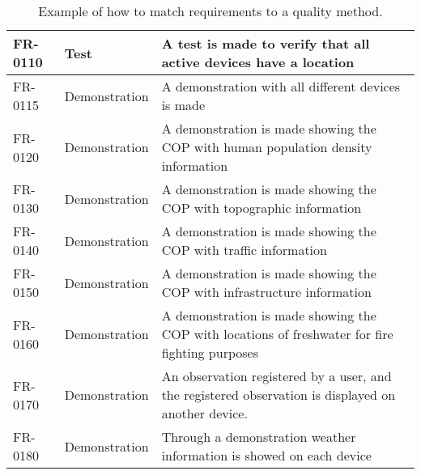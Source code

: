 \begin{table}[H]
\begin{tabular}{|l|l|p{6cm}|}
 FR-0110 & Test & A test is made to verify that all active devices have a location \\  \hline
 FR-0115 & Demonstration & A demonstration with all different devices is made\\  \hline
 FR-0120 & Demonstration & A demonstration is made showing the COP with human population density information\\  \hline
 FR-0130 & Demonstration & A demonstration is made showing the COP with topographic information\\  \hline
 FR-0140 & Demonstration & A demonstration is made showing the COP with traffic information\\  \hline
 FR-0150 & Demonstration & A demonstration is made showing the COP with infrastructure information \\  \hline
 FR-0160 & Demonstration & A demonstration is made showing the COP with locations of freshwater for fire fighting purposes \\  \hline
 FR-0170 & Demonstration & An observation registered by a user, and the registered observation is displayed on another device. \\  \hline
 FR-0180 & Demonstration & Through a demonstration weather information is showed on each device\\  \hline
\end{tabular}
\caption{Example of how to match requirements to a quality method.}
\end{table}